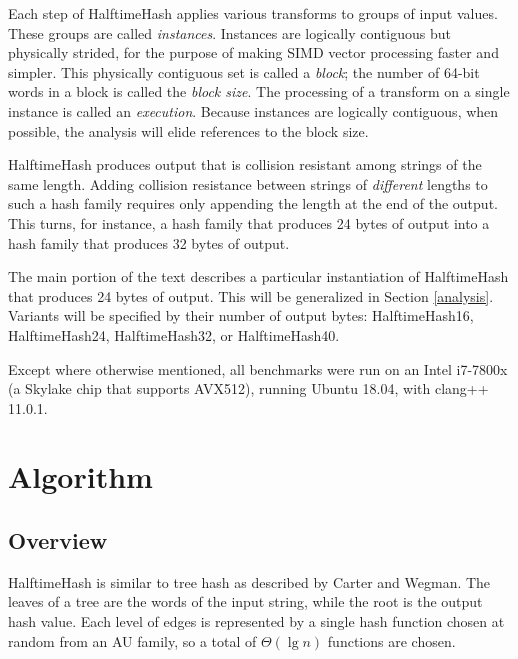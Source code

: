 \documentclass[runningheads]{llncs}
\begin{document}
Each step of HalftimeHash applies various transforms to groups of input values.
These groups are called {\em instances}.
Instances are logically contiguous but physically strided, for the purpose of making SIMD vector processing faster and simpler.
This physically contiguous set is called a {\em block}; the number of 64-bit words in a block is called the {\em block size}.
The processing of a transform on a single instance is called an {\em execution}.
Because instances are logically contiguous, when possible, the analysis will elide references to the block size.

HalftimeHash produces output that is collision resistant among strings of the same length.
Adding collision resistance between strings of {\em different} lengths to such a hash family requires only appending the length at the end of the output.
This turns, for instance, a hash family that produces 24 bytes of output into a hash family that produces 32 bytes of output.

The main portion of the text describes a particular instantiation of HalftimeHash that produces 24 bytes of output.
This will be generalized in Section \ref{analysis}.
Variants will be specified by their number of output bytes: HalftimeHash16, HalftimeHash24, HalftimeHash32, or HalftimeHash40.

Except where otherwise mentioned, all benchmarks were run on an Intel i7-7800x (a Skylake chip that supports AVX512), running Ubuntu 18.04, with clang++ 11.0.1.



\section{Algorithm}
\label{algo}

\subsection{Overview}

HalftimeHash is similar to tree hash as described by Carter and Wegman. \cite{carter-wegman-79}
The leaves of a tree are the words of the input string, while the root is the output hash value.
Each level of edges is represented by a single hash function chosen at random from an AU family, so a total of $\Theta(\lg n)$ functions are chosen.
\end{document}
